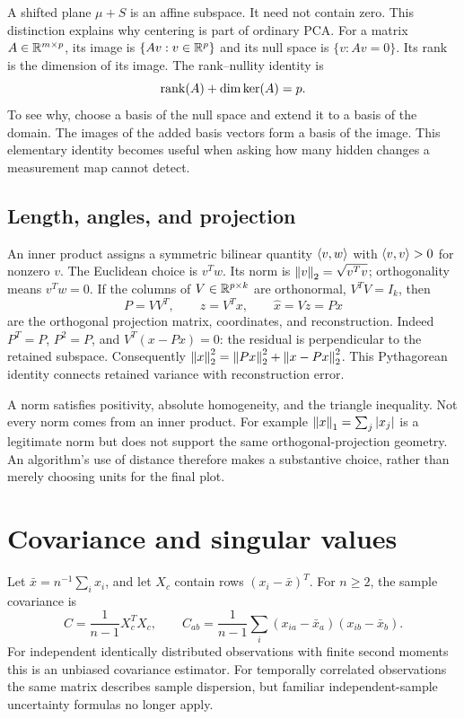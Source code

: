 A shifted plane $\mu+S$ is an affine subspace. It need not contain zero. This distinction explains why centering is part of ordinary PCA. For a matrix $A\in\mathbb{R}^{m\times p}$, its image is $\{Av:v\in\mathbb{R}^p\}$ and its null space is $\{v:Av=0\}$. Its rank is the dimension of its image. The rank--nullity identity is
\begin{equation}
\operatorname{rank}(A)+\dim\ker(A)=p.
\end{equation}
To see why, choose a basis of the null space and extend it to a basis of the domain. The images of the added basis vectors form a basis of the image. This elementary identity becomes useful when asking how many hidden changes a measurement map cannot detect.

\subsection{Length, angles, and projection}
An inner product assigns a symmetric bilinear quantity $\left\langle v,w\right\rangle$ with $\left\langle v,v\right\rangle>0$ for nonzero $v$. The Euclidean choice is $v^Tw$. Its norm is $\left\lVert v\right\rVert_2=\sqrt{v^Tv}$; orthogonality means $v^Tw=0$. If the columns of $V\in\mathbb{R}^{p\times k}$ are orthonormal, $V^TV=I_k$, then
\begin{equation}\label{eq:orth-projection}
P=VV^T,\qquad z=V^Tx,\qquad \widehat x=Vz=Px
\end{equation}
are the orthogonal projection matrix, coordinates, and reconstruction. Indeed $P^T=P$, $P^2=P$, and $V^T(x-Px)=0$: the residual is perpendicular to the retained subspace. Consequently
$\left\lVert x\right\rVert_2^2=\left\lVert Px\right\rVert_2^2+\left\lVert x-Px\right\rVert_2^2$.
This Pythagorean identity connects retained variance with reconstruction error.

A norm satisfies positivity, absolute homogeneity, and the triangle inequality. Not every norm comes from an inner product. For example $\left\lVert x\right\rVert_1=\sum_j|x_j|$ is a legitimate norm but does not support the same orthogonal-projection geometry. An algorithm's use of distance therefore makes a substantive choice, rather than merely choosing units for the final plot.

\section{Covariance and singular values}
Let $\bar x=n^{-1}\sum_i x_i$, and let $X_c$ contain rows $(x_i-\bar x)^T$. For $n\geq2$, the sample covariance is
\begin{equation}\label{eq:sample-covariance}
C=\frac{1}{n-1}X_c^TX_c,\qquad C_{ab}=\frac{1}{n-1}\sum_i(x_{ia}-\bar x_a)(x_{ib}-\bar x_b).
\end{equation}
For independent identically distributed observations with finite second moments this is an unbiased covariance estimator. For temporally correlated observations the same matrix describes sample dispersion, but familiar independent-sample uncertainty formulas no longer apply.

